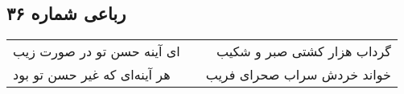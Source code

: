\begin{center}
\section*{رباعی شماره ۳۶}
\label{sec:sh036}
\begin{longtable}{l p{0.5cm} r}
ای آینه حسن تو در صورت زیب
&&
گرداب هزار کشتی صبر و شکیب
\\
هر آینه‌ای که غیر حسن تو بود
&&
خواند خردش سراب صحرای فریب
\\
\end{longtable}
\end{center}
